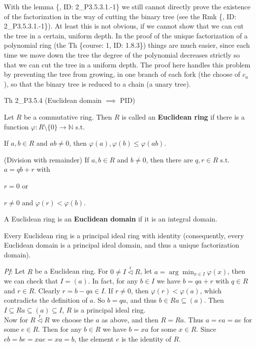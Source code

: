 \documentclass{article}
\newcommand{\nles}{\vartriangleleft}
\newcommand{\ideal}{\overset{\text{r}}{\nles}} %
\begin{document}
\begin{Rmk}{}
    With the lemma \{, ID: 2\_P3.5.3.1.-1\} we still cannot directly prove the existence of the factorization in the way of cutting the binary tree (see the Rmk \{, ID: 2\_P3.5.3.1.-1\}). At least this is not obvious, if we cannot show that we can cut the tree in a certain, uniform depth. In the proof of the unique factorization of a polynomial ring (the Th \{course: 1, ID: 1.8.3\}) things are much easier, since each time we move down the tree the degree of the polynomial decreases strictly so that we can cut the tree in a uniform depth. The proof here handles this problem by preventing the tree from growing, in one branch of each fork (the choose of $c_a$), so that the binary tree is reduced to a chain (a unary tree). 
\end{Rmk}

\begin{Th}{Th 2\_P3.5.4 (Euclidean domain $\implies$ PID)}
    \begin{compactitem}
        \item \textcolor{Df}{Let $R$ be a commutative ring. Then $R$ is called an \textbf{Euclidean ring} if there is a function $\varphi:R\setminus\{0\}\to\mathbb{N}$ s.t.
        \begin{compactenum}
            \item If $a, b\in R$ and $ab\neq 0$, then $\varphi(a), \varphi(b) \leq \varphi(ab)$.
            \item (Division with remainder) If $a, b\in R$ and $b\neq 0$, then there are $q, r\in R$ s.t. $a = qb + r$ with
            \begin{compactenum}
                \item $r=0$ or
                \item $r\neq 0$ and $\varphi(r) < \varphi(b)$.
            \end{compactenum}
        \end{compactenum}}
        \item \textcolor{Df}{A Euclidean ring is an \textbf{Euclidean domain} if it is an integral domain.}
        \item Every Euclidean ring is a principal ideal ring with identity (consequently, every Euclidean domain is a principal ideal domain, and thus a unique factorization domain).
    \end{compactitem}
    \tcblower
    \textit{Pf}: Let $R$ be a Euclidean ring. For $0\neq I\ideal R$, let $a = \arg\min_{x\in I}\varphi(x)$, then we can check that $I = (a)$. In fact, for any $b\in I$ we have $b = qa + r$ with $q\in R$ and $r\in R$. Clearly $r = b-qa\in I$. If $r\neq 0$, then $\varphi(r) < \varphi(a)$, which contradicts the definition of $a$. So $b = qa$, and thus $b\in Ra\subseteq (a)$. Then $I\subseteq Ra\subseteq (a)\subseteq I$, $R$ is a principal ideal ring. \\
    Now for $R\ideal R$ we choose the $a$ as above, and then $R = Ra$. Thus $a = ea = ae$ for some $e\in R$. Then for any $b\in R$ we have $b = xa$ for some $x\in R$. Since $eb = be = xae = xa = b$, the element $e$ is the identity of $R$. 
\end{Th}
\end{document}
